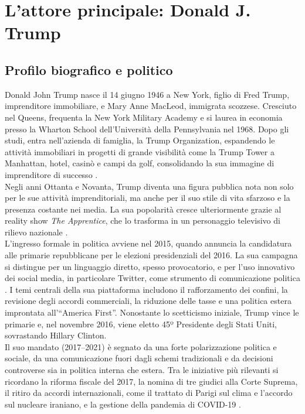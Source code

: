 \chapter{L’attore principale: Donald J. Trump}

\section{Profilo biografico e politico}

Donald John Trump nasce il 14 giugno 1946 a New York, figlio di Fred Trump, imprenditore immobiliare, e Mary Anne MacLeod, immigrata scozzese. Cresciuto nel Queens, frequenta la New York Military Academy e si laurea in economia presso la Wharton School dell’Università della Pennsylvania nel 1968. Dopo gli studi, entra nell’azienda di famiglia, la Trump Organization, espandendo le attività immobiliari in progetti di grande visibilità come la Trump Tower a Manhattan, hotel, casinò e campi da golf, consolidando la sua immagine di imprenditore di successo \cite{blair2001}. \\
Negli anni Ottanta e Novanta, Trump diventa una figura pubblica nota non solo per le sue attività imprenditoriali, ma anche per il suo stile di vita sfarzoso e la presenza costante nei media. La sua popolarità cresce ulteriormente grazie al reality show \emph{The Apprentice}, che lo trasforma in un personaggio televisivo di rilievo nazionale \cite{mcintosh2016}. \\
L’ingresso formale in politica avviene nel 2015, quando annuncia la candidatura alle primarie repubblicane per le elezioni presidenziali del 2016. La sua campagna si distingue per un linguaggio diretto, spesso provocatorio, e per l’uso innovativo dei social media, in particolare Twitter, come strumento di comunicazione politica \cite{ott2017}. I temi centrali della sua piattaforma includono il rafforzamento dei confini, la revisione degli accordi commerciali, la riduzione delle tasse e una politica estera improntata all’“America First”. Nonostante lo scetticismo iniziale, Trump vince le primarie e, nel novembre 2016, viene eletto 45º Presidente degli Stati Uniti, sovrastando Hillary Clinton. \\
Il suo mandato (2017–2021) è segnato da una forte polarizzazione politica e sociale, da una comunicazione fuori dagli schemi tradizionali e da decisioni controverse sia in politica interna che estera. Tra le iniziative più rilevanti si ricordano la riforma fiscale del 2017, la nomina di tre giudici alla Corte Suprema, il ritiro da accordi internazionali, come il trattato di Parigi sul clima e l’accordo sul nucleare iraniano, e la gestione della pandemia di COVID-19 \cite{baker2020}. \\
